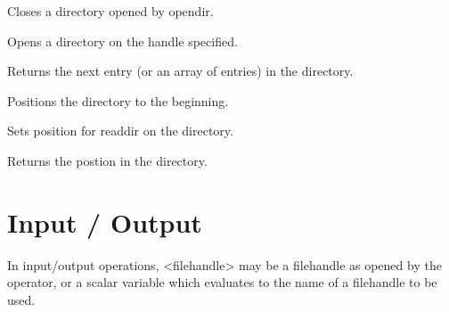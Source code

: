 \begin{enum}{1cm}

Closes a directory opened by opendir.

Opens a directory on the handle specified.

Returns the next entry (or an array of entries) in the directory.

Positions the directory to the beginning.

Sets position for readdir on the directory.

Returns the postion in the directory.

\end{enum}
\section{Input / Output} 

In input/output operations, <filehandle> may be a filehandle as opened
by the  operator, or a scalar variable which evaluates to
the name of a filehandle to be used.  

